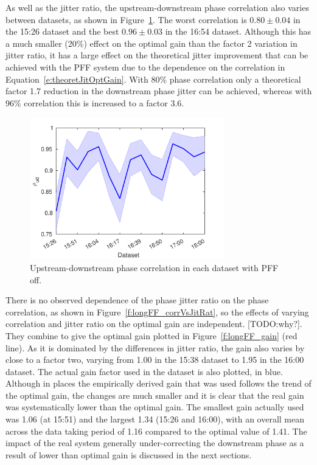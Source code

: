 As well as the jitter ratio, the upstream-downstream phase correlation also varies between datasets, as shown in Figure~\ref{f:longFF_corrFFOff}. The worst correlation is \(0.80\pm0.04\) in the 15:26 dataset and the best \(0.96\pm0.03\) in the 16:54 dataset. Although this has a much smaller (20\%) effect on the optimal gain than the factor 2 variation in jitter ratio, it has a large effect on the theoretical jitter improvement that can be achieved with the PFF system due to the dependence on the correlation in Equation~\ref{e:theoretJitOptGain}. With 80\% phase correlation only a theoretical factor 1.7 reduction in the downstream phase jitter can be achieved, whereas with 96\% correlation this is increased to a factor 3.6.

\begin{figure}
  \centering
  \includegraphics[width=0.75\textwidth]{Figures/feedforward/longFF_corrFFOff}
  \caption{Upstream-downstream phase correlation in each dataset with PFF off.}
  \label{f:longFF_corrFFOff}
\end{figure}

There is no observed dependence of the phase jitter ratio on the phase correlation, as shown in Figure~\ref{f:longFF_corrVsJitRat}, so the effects of varying correlation and jitter ratio on the optimal gain are independent. [TODO:why?]. They combine to give the optimal gain plotted in Figure~\ref{f:longFF_gain} (red line). As it is dominated by the differences in jitter ratio, the gain also varies by close to a factor two, varying from 1.00 in the 15:38 dataset to 1.95 in the 16:00 dataset. The actual gain factor used in the dataset is also plotted, in blue. Although in places the empirically derived gain that was used follows the trend of the optimal gain, the changes are much smaller and it is clear that the real gain was systematically lower than the optimal gain. The smallest gain actually used was 1.06 (at 15:51) and the largest 1.34 (15:26 and 16:00), with an overall mean across the data taking period of 1.16 compared to the optimal value of 1.41. The impact of the real system generally under-correcting the downstream phase as a result of lower than optimal gain is discussed in the next sections.

